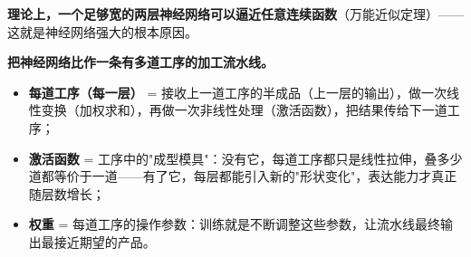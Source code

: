 \documentclass[a4paper,11pt]{ctexart}
\begin{document}
\textbf{理论上，一个足够宽的两层神经网络可以逼近任意连续函数}（万能近似定理）——这就是神经网络强大的根本原因。

\begin{metaphorbox}
    \textbf{把神经网络比作一条有多道工序的加工流水线。}

    \begin{itemize}
        \item \textbf{每道工序（每一层）} = 接收上一道工序的半成品（上一层的输出），做一次线性变换（加权求和），再做一次非线性处理（激活函数），把结果传给下一道工序；
        \item \textbf{激活函数} = 工序中的"成型模具"：没有它，每道工序都只是线性拉伸，叠多少道都等价于一道——有了它，每层都能引入新的"形状变化"，表达能力才真正随层数增长；
        \item \textbf{权重} = 每道工序的操作参数：训练就是不断调整这些参数，让流水线最终输出最接近期望的产品。
    \end{itemize}
\end{metaphorbox}
\end{document}
